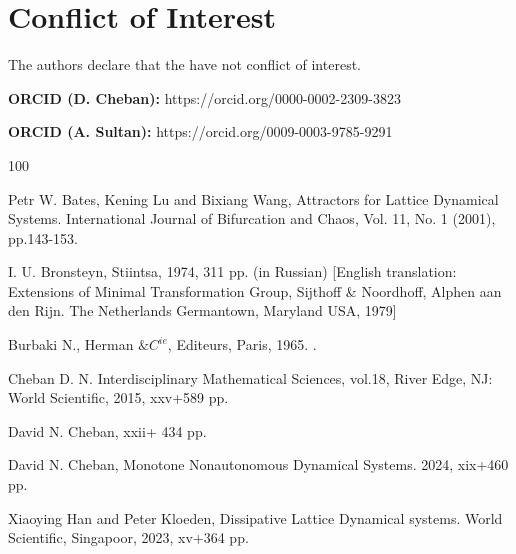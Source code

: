 \documentclass{amsart}%
\begin{document}
\section{Conflict of Interest}

The authors declare that the have not conflict of interest.


\medskip
\textbf{ORCID (D. Cheban):} https://orcid.org/0000-0002-2309-3823


\textbf{ORCID (A. Sultan):} https://orcid.org/0009-0003-9785-9291



\begin{thebibliography}{100}

 Petr W. Bates, Kening Lu and Bixiang Wang,
\newblock Attractors for Lattice Dynamical Systems.
\newblock International Journal of Bifurcation
and Chaos, Vol. 11, No. 1 (2001), pp.143-153.

I. U. Bronsteyn,
 Stiintsa, 1974, 311 pp. (in Russian) [English
translation: Extensions of Minimal Transformation Group, Sijthoff
\& Noordhoff, Alphen aan den Rijn. The Netherlands Germantown,
Maryland USA, 1979]


 Burbaki N.,
 Herman $\& C^{ie}$, Editeurs, Paris, 1965. .

 Cheban D. N.
\newblock Interdisciplinary Mathematical Sciences,
vol.18, River Edge, NJ: World Scientific, 2015, xxv+589 pp.


 David N. Cheban,
 xxii+ 434 pp.

 David N. Cheban,
\newblock Monotone Nonautonomous Dynamical Systems.
 2024, xix+460 pp.



 Xiaoying Han and Peter Kloeden,
\newblock Dissipative Lattice Dynamical systems.
\newblock World Scientific, Singapoor, 2023, xv+364 pp.


\end{thebibliography}
\end{document}
